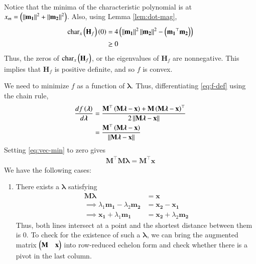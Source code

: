 \documentclass[journal,12pt,twocolumn]{IEEEtran}
\renewcommand{\vec}[1]{\boldsymbol{\mathbf{#1}}}
\begin{document}
\begin{enumerate}
\begin{align}
                                        \label{eq:char-H-f}
    \end{align}
    Notice that the minima of the characteristic polynomial is at 
    $x_m = \brak{\norm{\vec{m_1}}^2+\norm{\vec{m_2}}^2}$. Also, using Lemma
    \ref{lem:dot-mag},
    \begin{align}
        \textrm{char}_x\brak{\vec{H}_f}\brak{0} &= 4\brak{\norm{\vec{m_1}}^2\norm{\vec{m_2}}^2 - \brak{\vec{m_1}^\top\vec{m_2}}} \\
        &\ge 0
    \end{align}
    Thus, the zeros of $\textrm{char}_x\brak{\vec{H}_f}$, or the eigenvalues 
    of $\vec{H}_f$ are nonnegative. This implies that $\vec{H}_f$ is
    positive definite, and so $f$ is convex.

    We need to minimize $f$ as a function of $\vec{\lambda}$. Thus, 
    differentiating \eqref{eq:f-def} using the chain rule,
    \begin{align}
        \frac{df\brak{\vec{\lambda}}}{d\vec{\lambda}} &= \frac{\vec{M}^\top\brak{\vec{M\lambda}-\vec{x}}+\vec{M}\brak{\vec{M\lambda}-\vec{x}}^\top}{2\norm{\vec{M\lambda}-\vec{x}}} \\
                                                      &= \frac{\vec{M}^\top\brak{\vec{M\lambda}-\vec{x}}}{\norm{\vec{M\lambda}-\vec{x}}}
        \label{eq:vec-min}
    \end{align}
    Setting \eqref{eq:vec-min} to zero gives
    \begin{align}
        \vec{M}^\top\vec{M\lambda} = \vec{M}^\top\vec{x}
        \label{eq:vec-eqn}
    \end{align}
    We have the following cases:
    \begin{enumerate}
        \item There exists a $\vec{\lambda}$ satisfying
        \begin{align}
            \vec{M}\vec{\lambda} &= \vec{x} \\
            \implies \lambda_1\vec{m_1} - \lambda_2\vec{m_2} &= \vec{x_2}-\vec{x_1} \\
            \implies \vec{x_1} + \lambda_1\vec{m_1} &= \vec{x_2} + \lambda_2\vec{m_2}
            \label{eq:intersect}
        \end{align}
        Thus, both lines intersect at a point and the shortest
        distance between them is 0. To check for the existence of such a 
        $\vec{\lambda}$, we can bring the augmented matrix 
        $\myvec{\vec{M}&\vec{x}}$ into row-reduced echelon form and check 
        whether there is a pivot in the last column.


\end{enumerate}
\end{enumerate}
\end{document}

